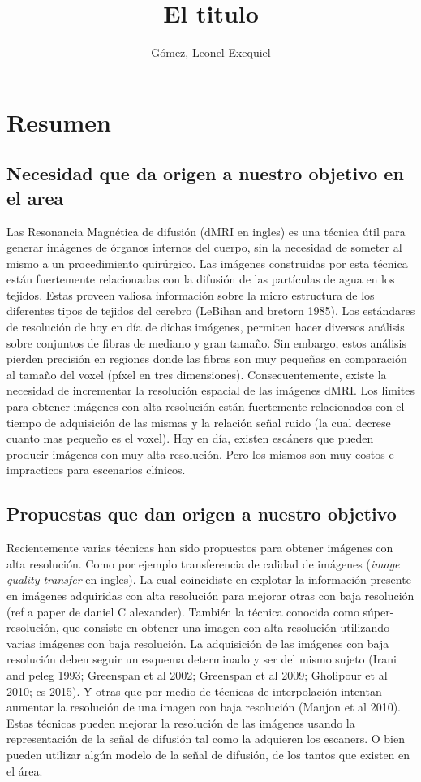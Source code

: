 \documentclass[a4paper,10pt]{article}
\title{El titulo}
\author{Gómez, Leonel Exequiel}
\begin{document}
\maketitle

\section{Resumen}

\subsection{Necesidad que da origen a nuestro objetivo en el area}
Las Resonancia Magnética de difusión (dMRI en ingles) es una técnica útil para generar imágenes de órganos internos del 
cuerpo, sin la necesidad de someter al mismo a un procedimiento quirúrgico. Las imágenes construidas por esta técnica 
están fuertemente relacionadas con la difusión de las partículas de agua en los tejidos. Estas proveen valiosa 
información sobre la micro estructura de los diferentes tipos de tejidos del cerebro (LeBihan and 
bretorn 1985). Los estándares de resolución de hoy en día de dichas imágenes, permiten hacer 
diversos análisis sobre conjuntos de fibras de mediano y gran tamaño. Sin embargo, estos análisis 
pierden precisión en regiones donde las fibras son muy pequeñas en comparación 
al tamaño del voxel (píxel en tres dimensiones). Consecuentemente, existe la necesidad de 
incrementar la resolución espacial de las imágenes dMRI. Los limites para 
obtener imágenes con alta resolución están fuertemente relacionados con el 
tiempo de adquisición de las mismas y la relación señal ruido (la cual decrese 
cuanto mas pequeño es el voxel). Hoy en día, existen escáners que pueden 
producir imágenes con muy alta resolución. Pero los mismos son muy costos e 
impracticos para escenarios clínicos.


\subsection{Propuestas que dan origen a nuestro objetivo}
Recientemente varias técnicas han sido propuestos para obtener imágenes con alta resolución. Como por ejemplo 
transferencia de calidad de imágenes (\textit{image quality transfer} en ingles). La cual coincidiste en explotar la 
información presente en imágenes adquiridas con alta resolución para mejorar otras con baja resolución 
(ref a paper de daniel C alexander). También la técnica conocida como súper-resolución, que consiste en obtener una 
imagen con alta resolución utilizando varias imágenes con baja resolución. La adquisición de las imágenes con baja 
resolución deben seguir un esquema determinado y ser del mismo sujeto (Irani and peleg 1993; Greenspan et al 
2002; Greenspan et al 2009; Gholipour et al 2010; cs 2015). Y otras que por medio de técnicas de interpolación intentan 
aumentar la resolución de una imagen con baja resolución (Manjon et al 2010). Estas técnicas pueden mejorar la 
resolución de las imágenes usando la representación de la señal de difusión tal como la adquieren los escaners. O bien 
pueden utilizar algún modelo de la señal de difusión, de los tantos que existen en el área.
\end{document}
